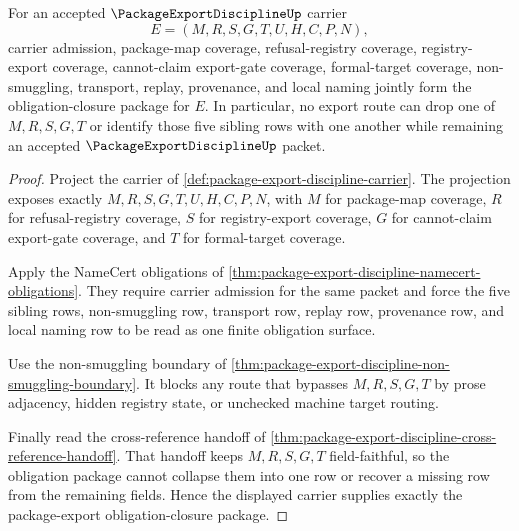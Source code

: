 \begin{theorem}
\label{thm:package-export-discipline-obligation-closure-package}
For an accepted $\PackageExportDisciplineUp$ carrier
$$
E=(M,R,S,G,T,U,H,C,P,N),
$$
carrier admission, package-map coverage, refusal-registry coverage, registry-export coverage, cannot-claim export-gate coverage, formal-target coverage, non-smuggling, transport, replay, provenance, and local naming jointly form the obligation-closure package for $E$. In particular, no export route can drop one of $M,R,S,G,T$ or identify those five sibling rows with one another while remaining an accepted $\PackageExportDisciplineUp$ packet.
\end{theorem}
\begin{proof}
Project the carrier of \autoref{def:package-export-discipline-carrier}. The projection exposes exactly $M,R,S,G,T,U,H,C,P,N$, with $M$ for package-map coverage, $R$ for refusal-registry coverage, $S$ for registry-export coverage, $G$ for cannot-claim export-gate coverage, and $T$ for formal-target coverage.

Apply the NameCert obligations of \autoref{thm:package-export-discipline-namecert-obligations}. They require carrier admission for the same packet and force the five sibling rows, non-smuggling row, transport row, replay row, provenance row, and local naming row to be read as one finite obligation surface.

Use the non-smuggling boundary of \autoref{thm:package-export-discipline-non-smuggling-boundary}. It blocks any route that bypasses $M,R,S,G,T$ by prose adjacency, hidden registry state, or unchecked machine target routing.

Finally read the cross-reference handoff of \autoref{thm:package-export-discipline-cross-reference-handoff}. That handoff keeps $M,R,S,G,T$ field-faithful, so the obligation package cannot collapse them into one row or recover a missing row from the remaining fields. Hence the displayed carrier supplies exactly the package-export obligation-closure package.
\end{proof}



